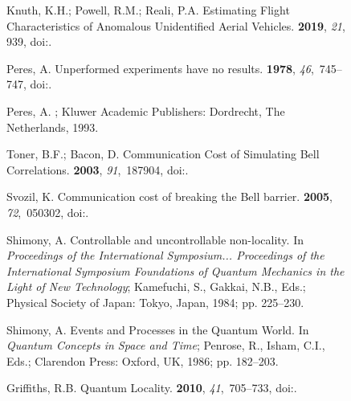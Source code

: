 \documentclass[entropy,article,accept,oneauthor,pdftex]{Definitions/mdpi}
\begin{document}
\begin{figure}[H]
\begin{thebibliography}{999}
Knuth, K.H.; Powell, R.M.; Reali, P.A.
\newblock Estimating Flight Characteristics of Anomalous Unidentified Aerial
  Vehicles.
 {\bf 2019}, {\em 21}, 939, doi:{\href{https://doi.org/10.3390/e21100939}{}}.

Peres, A.
\newblock Unperformed experiments have no results.
 {\bf 1978}, {\em 46},~745--747, doi:{\href{https://doi.org/10.1119/1.11393}{}}.

Peres, A.
; Kluwer Academic
  Publishers: Dordrecht, The Netherlands, 1993.

Toner, B.F.; Bacon, D.
\newblock Communication Cost of Simulating {B}ell Correlations.
 {\bf 2003}, {\em 91},~187904, doi:{\href{https://doi.org/10.1103/PhysRevLett.91.187904}{}}.

Svozil, K.
\newblock Communication cost of breaking the {B}ell barrier.
 {\bf 2005}, {\em 72},~050302, doi:{\href{https://doi.org/10.1103/PhysRevA.72.050302}{}}.

Shimony, A.
\newblock Controllable and uncontrollable non-locality.
\newblock In \emph{Proceedings of the International Symposium... Proceedings of the
  International Symposium Foundations of Quantum Mechanics in the Light of New
  Technology}; Kamefuchi, S., Gakkai, N.B., Eds.; Physical Society of Japan: Tokyo, Japan, 1984; pp. 225--230.

Shimony, A.
\newblock Events and Processes in the Quantum World. In {\em Quantum Concepts
  in Space and Time}; Penrose, R., Isham, C.I., Eds.; Clarendon Press: Oxford, UK, 1986; pp. 182--203.

Griffiths, R.B.
\newblock Quantum Locality.
 {\bf 2010}, {\em 41},~705--733, doi:{\href{https://doi.org/10.1007/s10701-010-9512-5}{}}.


\end{thebibliography}
\end{figure}
\end{document}
